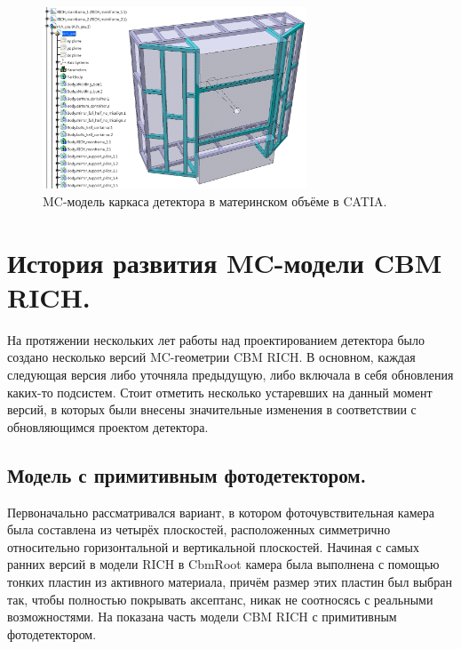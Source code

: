 \begin{figure}[H]
\centering
\includegraphics[width=0.7\textwidth]{pictures/Mainframe.png}
\caption{MC-модель каркаса детектора в материнском объёме в CATIA.}
\label{fig:geoMainframe}
\end{figure}

%                                                                          

\section{История развития MC-модели CBM RICH.}\label{sec:secRICHgeoHistory}

На протяжении нескольких лет работы над проектированием детектора было создано несколько версий MC-геометрии CBM RICH. В основном, каждая следующая версия либо уточняла предыдущую, либо включала в себя обновления каких-то подсистем. Стоит отметить несколько устаревших на данный момент версий, в которых были внесены значительные изменения в соответствии с обновляющимся проектом детектора.

\subsection{Модель с примитивным фотодетектором.}

Первоначально рассматривался вариант, в котором фоточувствительная камера была составлена из четырёх плоскостей, расположенных симметрично относительно горизонтальной и вертикальной плоскостей. Начиная с самых ранних версий в модели RICH в CbmRoot камера была выполнена с помощью тонких пластин из активного материала, причём размер этих пластин был выбран так, чтобы полностью покрывать аксептанс, никак не соотносясь с реальными возможностями. На  показана часть модели CBM RICH с примитивным фотодетектором.

